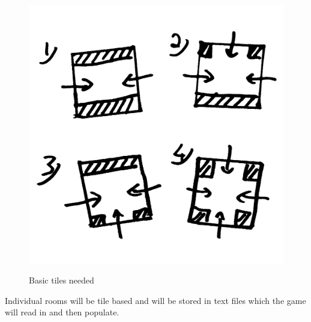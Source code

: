 \begin{figure}[ht]
\centering
\includegraphics[scale=0.2, trim = 0cm 0cm 0cm 5cm]{images/16x16}
\label{fig:16x}
\caption{Basic tiles needed}
\end{figure}

Individual rooms will be tile based and will be stored in text files which the game will read in and then populate.
